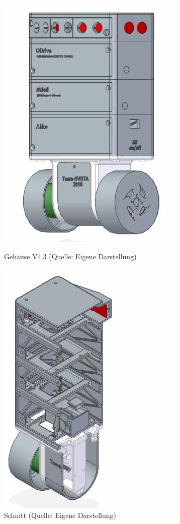 \begin{figure}[htb]
	\centering
	\begin{minipage}{0.45\linewidth}
		\centering
		\includegraphics[scale=0.48]{images/V.4.3.jpg}
		\caption{Gehäuse V4.3 \newline(Quelle: Eigene Darstellung)}
		\label{gehaeuse-v4.3}
	\end{minipage}
	\begin{minipage}{0.45\linewidth}
		\centering
		\includegraphics[scale=0.48]{images/V.4.3-1.jpg}
		\caption{ Schnitt \newline (Quelle: Eigene Darstellung)}
	\end{minipage}
\end{figure}

